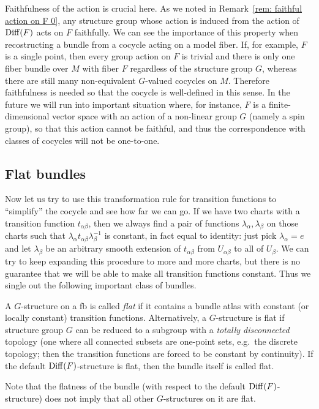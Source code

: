 \begin{rem}\label{rem: faithfulness of action on F}
    Faithfulness of the action is crucial here. As we noted in Remark~\ref{rem: faithful action on F 0}, any structure group whose action is induced from the action of $\operatorname{Diff}(F)$ acts on $F$ faithfully. We can see the importance of this property when recostructing a bundle from a cocycle acting on a model fiber. If, for example, $F$ is a single point, then every group action on $F$ is trivial and there is only one fiber bundle over $M$ with fiber $F$ regardless of the structure group $G$, whereas there are still many non-equivalent $G$-valued cocycles on $M$. Therefore faithfulness is needed so that the cocycle is well-defined in this sense. In the future we will run into important situation where, for instance, $F$ is a finite-dimensional vector space with an action of a non-linear group $G$ (namely a spin group), so that this action cannot be faithful, and thus the correspondence with classes of cocycles will not be one-to-one.
\end{rem}






\subsection{Flat bundles}

Now let us try to use this transformation rule for transition functions to ``simplify'' the cocycle and see how far we can go. If we have two charts with a transition function $t_{\alpha\beta}$, then we always find a pair of functions $\lambda_\alpha,\lambda_\beta$ on those charts such that $\lambda_\alpha t_{\alpha\beta}\lambda_\beta^{-1}$ is constant, in fact equal to identity: just pick $\lambda_\alpha=e$ and let $\lambda_\beta$ be an arbitrary smooth extension of $t_{\alpha\beta}$ from $U_{\alpha\beta}$ to all of $U_\beta$. We can try to keep expanding this procedure to more and more charts, but there is no guarantee that we will be able to make all transition functions constant. Thus we single out the following important class of bundles.

\begin{defn}
	A $G$-structure on a \gls{fb} is called \emph{flat} if it contains a bundle atlas with constant (or locally constant) transition functions. Alternatively, a $G$-structure is flat if structure group $G$ can be reduced to a subgroup with a \emph{totally disconnected} topology (one where all connected subsets are one-point sets, e.g.\ the discrete topology; then the transition functions are forced to be constant by continuity). If the default $\operatorname{Diff}(F)$-structure is flat, then the bundle itself is called flat.
\end{defn}
\begin{rem}
    Note that the flatness of the bundle (with respect to the default $\operatorname{Diff}(F)$-structure) does not imply that all other $G$-structures on it are flat.
\end{rem}


